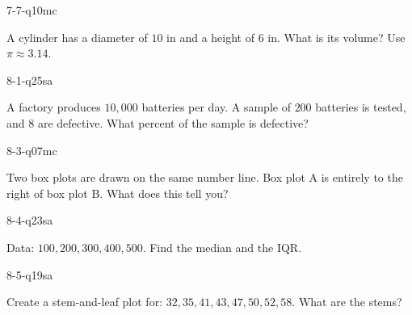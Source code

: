 \begin{practiceQuestion}{7-7-q10}{mc}
\begin{questionText}
A cylinder has a diameter of $10$ in and a height of $6$ in. What is its volume? Use $\pi \approx 3.14$.
\end{questionText}
\end{practiceQuestion}

\begin{practiceQuestion}{8-1-q25}{sa}
\begin{questionText}
A factory produces $10{,}000$ batteries per day. A sample of $200$ batteries is tested, and $8$ are defective. What percent of the sample is defective?
\end{questionText}
\end{practiceQuestion}

\begin{practiceQuestion}{8-3-q07}{mc}
\begin{questionText}
Two box plots are drawn on the same number line. Box plot A is entirely to the right of box plot B. What does this tell you?
\end{questionText}
\end{practiceQuestion}

\begin{practiceQuestion}{8-4-q23}{sa}
\begin{questionText}
Data: $100, 200, 300, 400, 500$. Find the median and the IQR.
\end{questionText}
\end{practiceQuestion}

\begin{practiceQuestion}{8-5-q19}{sa}
\begin{questionText}
Create a stem-and-leaf plot for: $32, 35, 41, 43, 47, 50, 52, 58$. What are the stems?
\end{questionText}
\end{practiceQuestion}

